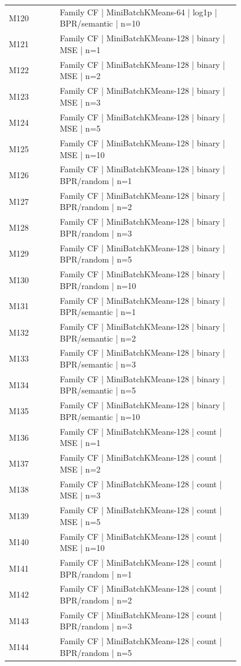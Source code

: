\begin{longtable}{lp{0.78\linewidth}}
M120 & Family CF | MiniBatchKMeans-64 | log1p | BPR/semantic | n=10 \\
M121 & Family CF | MiniBatchKMeans-128 | binary | MSE | n=1 \\
M122 & Family CF | MiniBatchKMeans-128 | binary | MSE | n=2 \\
M123 & Family CF | MiniBatchKMeans-128 | binary | MSE | n=3 \\
M124 & Family CF | MiniBatchKMeans-128 | binary | MSE | n=5 \\
M125 & Family CF | MiniBatchKMeans-128 | binary | MSE | n=10 \\
M126 & Family CF | MiniBatchKMeans-128 | binary | BPR/random | n=1 \\
M127 & Family CF | MiniBatchKMeans-128 | binary | BPR/random | n=2 \\
M128 & Family CF | MiniBatchKMeans-128 | binary | BPR/random | n=3 \\
M129 & Family CF | MiniBatchKMeans-128 | binary | BPR/random | n=5 \\
M130 & Family CF | MiniBatchKMeans-128 | binary | BPR/random | n=10 \\
M131 & Family CF | MiniBatchKMeans-128 | binary | BPR/semantic | n=1 \\
M132 & Family CF | MiniBatchKMeans-128 | binary | BPR/semantic | n=2 \\
M133 & Family CF | MiniBatchKMeans-128 | binary | BPR/semantic | n=3 \\
M134 & Family CF | MiniBatchKMeans-128 | binary | BPR/semantic | n=5 \\
M135 & Family CF | MiniBatchKMeans-128 | binary | BPR/semantic | n=10 \\
M136 & Family CF | MiniBatchKMeans-128 | count | MSE | n=1 \\
M137 & Family CF | MiniBatchKMeans-128 | count | MSE | n=2 \\
M138 & Family CF | MiniBatchKMeans-128 | count | MSE | n=3 \\
M139 & Family CF | MiniBatchKMeans-128 | count | MSE | n=5 \\
M140 & Family CF | MiniBatchKMeans-128 | count | MSE | n=10 \\
M141 & Family CF | MiniBatchKMeans-128 | count | BPR/random | n=1 \\
M142 & Family CF | MiniBatchKMeans-128 | count | BPR/random | n=2 \\
M143 & Family CF | MiniBatchKMeans-128 | count | BPR/random | n=3 \\
M144 & Family CF | MiniBatchKMeans-128 | count | BPR/random | n=5 \\

\end{longtable}
